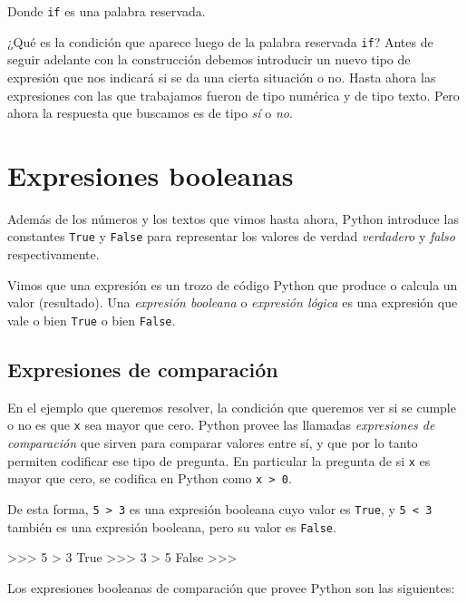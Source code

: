 Donde \lstinline+if+ es una palabra reservada.

¿Qué es la condición que aparece luego de la palabra reservada \lstinline+if+?
Antes de seguir adelante con la construcción debemos introducir
un nuevo tipo de expresión que nos indicará si se da una cierta situación o no.
Hasta ahora las expresiones con las que trabajamos fueron de tipo numérica y de tipo texto.
Pero ahora la respuesta que buscamos es de tipo {\it sí} o {\it no}.

\section{Expresiones booleanas}

Además de los números y los textos que vimos hasta ahora, Python introduce
las constantes \lstinline!True! y \lstinline!False! para representar los
valores de verdad {\it verdadero} y {\it falso} respectivamente.

Vimos que una expresión es un trozo de código Python que produce o calcula
un valor (resultado). Una {\it expresión booleana} o {\it expresión lógica}
es una expresión que vale o bien \lstinline!True! o bien \lstinline!False!.

\subsection{Expresiones de comparación}

En el ejemplo que queremos resolver, la condición que queremos ver si se
cumple o no es que \lstinline!x! sea mayor que cero. Python provee las
llamadas {\it expresiones de comparación} que sirven para comparar valores
entre sí, y que por lo tanto permiten codificar ese tipo de pregunta.  En
particular la pregunta de si \lstinline!x! es mayor que cero, se codifica
en Python como \lstinline!x > 0!.

De esta forma, \lstinline+5 > 3+ es una expresión booleana cuyo valor es
\lstinline!True!, y \lstinline+5 < 3+ también es una expresión booleana, pero su
valor es \lstinline!False!.

\begin{codigo-python-sn}
>>> 5 > 3
True
>>> 3 > 5
False
>>>
\end{codigo-python-sn}

Los expresiones
booleanas de comparación que provee Python son las siguientes:

